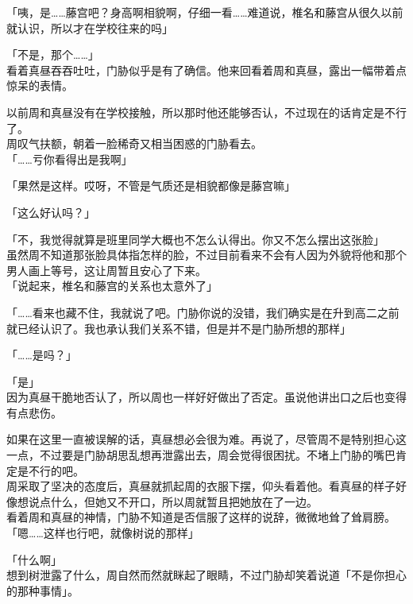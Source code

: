「咦，是……藤宫吧？身高啊相貌啊，仔细一看……难道说，椎名和藤宫从很久以前就认识，所以才在学校往来的吗」

「不是，那个……」\\

看着真昼吞吞吐吐，门胁似乎是有了确信。他来回看着周和真昼，露出一幅带着点惊呆的表情。

以前周和真昼没有在学校接触，所以那时他还能够否认，不过现在的话肯定是不行了。\\

周叹气扶额，朝着一脸稀奇又相当困惑的门胁看去。\\

「……亏你看得出是我啊」

「果然是这样。哎呀，不管是气质还是相貌都像是藤宫嘛」

「这么好认吗？」

「不，我觉得就算是班里同学大概也不怎么认得出。你又不怎么摆出这张脸」\\

虽然周不知道那张脸具体指怎样的脸，不过目前看来不会有人因为外貌将他和那个男人画上等号，这让周暂且安心了下来。\\

「说起来，椎名和藤宫的关系也太意外了」

「……看来也藏不住，我就说了吧。门胁你说的没错，我们确实是在升到高二之前就已经认识了。我也承认我们关系不错，但是并不是门胁所想的那样」

「……是吗？」

「是」\\

因为真昼干脆地否认了，所以周也一样好好做出了否定。虽说他讲出口之后也变得有点悲伤。

如果在这里一直被误解的话，真昼想必会很为难。再说了，尽管周不是特别担心这一点，不过要是门胁胡思乱想再泄露出去，周会觉得很困扰。不堵上门胁的嘴巴肯定是不行的吧。\\

周采取了坚决的态度后，真昼就抓起周的衣服下摆，仰头看着他。看真昼的样子好像想说点什么，但她又不开口，所以周就暂且把她放在了一边。\\

看着周和真昼的神情，门胁不知道是否信服了这样的说辞，微微地耸了耸肩膀。\\

「嗯……这样也行吧，就像树说的那样」

「什么啊」\\

想到树泄露了什么，周自然而然就眯起了眼睛，不过门胁却笑着说道「不是你担心的那种事情」。\\

